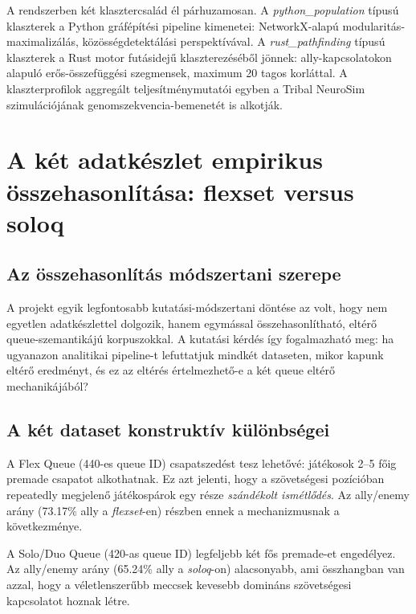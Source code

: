 A rendszerben két klasztercsalád él párhuzamosan. A \textit{python\_population} típusú klaszterek a Python gráfépítési pipeline kimenetei: NetworkX-alapú modularitás-maximalizálás, közösségdetektálási perspektívával. A \textit{rust\_pathfinding} típusú klaszterek a Rust motor futásidejű klaszterezéséből jönnek: ally-kapcsolatokon alapuló erős-összefüggési szegmensek, maximum 20 tagos korláttal. A klaszterprofilok aggregált teljesítménymutatói egyben a Tribal NeuroSim szimulációjának genomszekvencia-bemenetét is alkotják.

\chapter{A két adatkészlet empirikus összehasonlítása: flexset versus soloq}

\section{Az összehasonlítás módszertani szerepe}

A projekt egyik legfontosabb kutatási-módszertani döntése az volt, hogy nem egyetlen adatkészlettel dolgozik, hanem egymással összehasonlítható, eltérő queue-szemantikájú korpuszokkal. A kutatási kérdés így fogalmazható meg: ha ugyanazon analitikai pipeline-t lefuttatjuk mindkét dataseten, mikor kapunk eltérő eredményt, és ez az eltérés értelmezhető-e a két queue eltérő mechanikájából?

\section{A két dataset konstruktív különbségei}

A Flex Queue (440-es queue ID) csapatszedést tesz lehetővé: játékosok 2--5 főig premade csapatot alkothatnak. Ez azt jelenti, hogy a szövetségesi pozícióban repeatedly megjelenő játékospárok egy része \emph{szándékolt ismétlődés}. Az ally/enemy arány (73.17\% ally a \textit{flexset}-en) részben ennek a mechanizmusnak a következménye.

A Solo/Duo Queue (420-as queue ID) legfeljebb két fős premade-et engedélyez. Az ally/enemy arány (65.24\% ally a \textit{soloq}-on) alacsonyabb, ami összhangban van azzal, hogy a véletlenszerűbb meccsek kevesebb domináns szövetségesi kapcsolatot hoznak létre.


